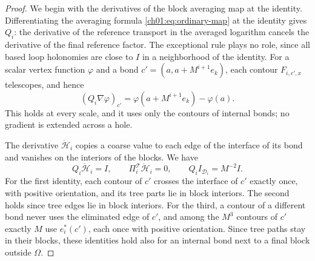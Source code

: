 \begin{proof}
We begin with the derivatives of the block averaging map at the identity. Differentiating the averaging formula \eqref{ch01:eq:ordinary-map} at the identity gives $Q_i$: the derivative of the reference transport in the averaged logarithm cancels the derivative of the final reference factor. The exceptional rule plays no role, since all based loop holonomies are close to $I$ in a neighborhood of the identity. For a scalar vertex function $\varphi$ and a bond $c'=(a,a+M^{i+1}e_k)$, each contour $F_{i,c',x}$ telescopes, and hence
\begin{equation}\label{ch15:eq:gradient-blocking}
 (Q_i\nabla\varphi)_{c'}=\varphi(a+M^{i+1}e_k)-\varphi(a).
\end{equation}
This holds at every scale, and it uses only the contours of internal bonds; no gradient is extended across a hole.

The derivative $\dot{\mathcal H}_i$ copies a coarse value to each edge of the interface of its bond and vanishes on the interiors of the blocks. We have
\begin{equation}\label{ch15:eq:lift-identities}
 Q_i\dot{\mathcal H}_i=I,\qquad \Pi^{\mathcal T}_i\dot{\mathcal H}_i=0,\qquad
 Q_iI_{\mathcal D_i}=M^{-2}I .
\end{equation}
For the first identity, each contour of $c'$ crosses the interface of $c'$ exactly once, with positive orientation, and its tree parts lie in block interiors. The second holds since tree edges lie in block interiors. For the third, a contour of a different bond never uses the eliminated edge of $c'$, and among the $M^3$ contours of $c'$ exactly $M$ use $e^*_i(c')$, each once with positive orientation. Since tree paths stay in their blocks, these identities hold also for an internal bond next to a final block outside $\Omega$.


\end{proof}
